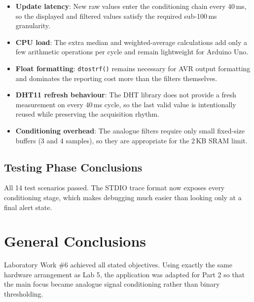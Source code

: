 \documentclass[12pt]{article}
\begin{document}
\begin{itemize}
    \item \textbf{Update latency}: New raw values enter the conditioning chain every 40\,ms, so the displayed and filtered values satisfy the required sub-100\,ms granularity.
    \item \textbf{CPU load}: The extra median and weighted-average calculations add only a few arithmetic operations per cycle and remain lightweight for Arduino Uno.
    \item \textbf{Float formatting}: \texttt{dtostrf()} remains necessary for AVR output formatting and dominates the reporting cost more than the filters themselves.
    \item \textbf{DHT11 refresh behaviour}: The DHT library does not provide a fresh measurement on every 40\,ms cycle, so the last valid value is intentionally reused while preserving the acquisition rhythm.
    \item \textbf{Conditioning overhead}: The analogue filters require only small fixed-size buffers (3 and 4 samples), so they are appropriate for the 2\,KB SRAM limit.
\end{itemize}

\subsection{Testing Phase Conclusions}
\hspace{0.8cm} All 14 test scenarios passed. The STDIO trace format now exposes every conditioning stage, which makes debugging much easier than looking only at a final alert state.

\section*{General Conclusions}
\hspace{0.8cm} Laboratory Work \#6 achieved all stated objectives. Using exactly the same hardware arrangement as Lab 5, the application was adapted for Part 2 so that the main focus became analogue signal conditioning rather than binary thresholding.
\end{document}
